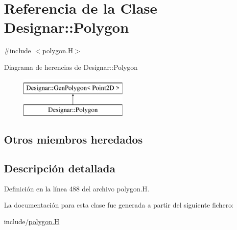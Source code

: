 \hypertarget{class_designar_1_1_polygon}{}\section{Referencia de la Clase Designar\+:\+:Polygon}
\label{class_designar_1_1_polygon}


{\ttfamily \#include $<$polygon.\+H$>$}

Diagrama de herencias de Designar\+:\+:Polygon\begin{figure}[H]
\begin{center}
\leavevmode
\includegraphics[height=2.000000cm]{class_designar_1_1_polygon}
\end{center}
\end{figure}
\subsection*{Otros miembros heredados}


\subsection{Descripción detallada}


Definición en la línea 488 del archivo polygon.\+H.



La documentación para esta clase fue generada a partir del siguiente fichero\+:\begin{DoxyCompactItemize}
\item 
include/\hyperlink{polygon_8_h}{polygon.\+H}\end{DoxyCompactItemize}
